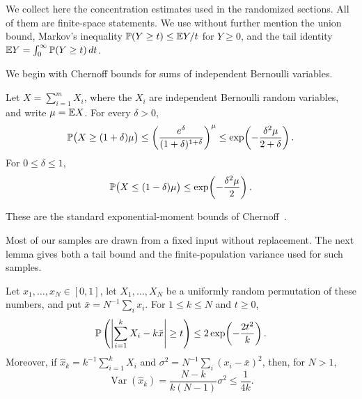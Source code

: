 We collect here the concentration estimates used in the randomized sections.
All of them are finite-space statements.  We use without further mention the
union bound, Markov's inequality
$\mathbb{P}(Y\ge t)\le \mathbb{E} Y/t$ for $Y\ge0$, and the tail identity
$\mathbb{E} Y=\int_0^\infty\mathbb{P}(Y\ge t)\,dt$.

We begin with Chernoff bounds for sums of independent Bernoulli variables.

\begin{lemma}
\label{lem:chernoff}
Let $X=\sum_{i=1}^m X_i$, where the $X_i$ are independent Bernoulli random
variables, and write $\mu=\mathbb{E} X$.  For every $\delta>0$,
\begin{equation}
 \mathbb{P}\bigl(X\ge(1+\delta)\mu\bigr)
 \le \left(\frac{e^\delta}{(1+\delta)^{1+\delta}}\right)^\mu
 \le \exp\!\left(-\frac{\delta^2\mu}{2+\delta}\right).
 \label{eq:chernoff-upper}
\end{equation}
For $0\le\delta\le1$,
\begin{equation}
 \mathbb{P}\bigl(X\le(1-\delta)\mu\bigr)
 \le \exp\!\left(-\frac{\delta^2\mu}{2}\right).
 \label{eq:chernoff-lower}
\end{equation}
\end{lemma}

These are the standard exponential-moment bounds of
Chernoff~\cite{Chernoff1952}.

Most of our samples are drawn from a fixed input without replacement.  The
next lemma gives both a tail bound and the finite-population variance used
for such samples.

\begin{lemma}
\label{lem:sampling-without-replacement}
Let $x_1,\ldots,x_N\in[0,1]$, let $X_1,\ldots,X_N$ be a uniformly random
permutation of these numbers, and put
$\bar x=N^{-1}\sum_i x_i$.  For $1\le k\le N$ and $t\ge0$,
\begin{equation}
 \mathbb{P}\left(\left|\sum_{i=1}^kX_i-k\bar x\right|\ge t\right)
 \le 2\exp\!\left(-\frac{2t^2}{k}\right).
 \label{eq:without-replacement-hoeffding}
\end{equation}
Moreover, if $\widehat x_k=k^{-1}\sum_{i=1}^kX_i$ and
$\sigma^2=N^{-1}\sum_i(x_i-\bar x)^2$, then, for $N>1$,
\begin{equation}
 \operatorname{Var}(\widehat x_k)
 =\frac{N-k}{k(N-1)}\sigma^2
 \le\frac{1}{4k}.
 \label{eq:without-replacement-variance}
\end{equation}
\end{lemma}

